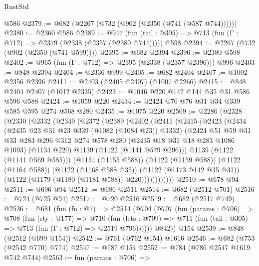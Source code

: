 \begin{lexlean}{RustStd}
\begin{coremodule}
    @586
@2379 := @682 (@2267 (@732 (@902 (@2350 (@741 (@587 @744))))))
@2380 := @2360 @586
@2389 := @947
    (fun (tail : @305) => @713 (fun (Γ : @712) => @2379 (@2338 (@2357 (@2380 @744)))))
    @598
@2394 := @2267 (@732 (@902 (@2350 (@741 @599))))
@2395 := @682 @2394
@2396 := @2380 @598
@2402 := @965 (fun (Γ : @712) => @2395 (@2338 (@2357 @2396))) @996
@2403 := @848 @2394
@2404 := @2336 @999
@2405 := @682 @2404
@2407 := @1002 @2356 @2396
@2411 := @2403 (@2405 @2407) (@1007 @2266)
@2415 := @848 @2404 @2407 (@1012 @2335)
@2423 := @1046 @220 @142 @144 @35 @31 @586 @596 @588
@2424 := @1059 @220
@2434 := @2424 @70 @76 @31 @34 @339 @585 @595 @274 @568 @280
@2435 := @1075 @220
@2509 := @2286
    (@2328
      (@2330
        (@2332
          (@2349
            (@2372
              (@2389
                (@2402
                  (@2411
                    (@2415
                      (@2423
                        (@2434
                          (@2435 @23 @31 @23 @339 (@1082 (@1084 @23)) @1332)
                          (@2424
                            @51
                            @59
                            @31
                            @33
                            @283
                            @296
                            @312
                            @274
                            @578
                            @280
                            (@2435 @18 @31 @18 @283 @1086 @1093)
                            (@1134 @220)
                            @1139
                            (@1122 (@1141 @579 @296)))
                          @1139
                          (@1122 (@1141 @569 @585)))
                        (@1154 (@1155 @588))
                        (@1122 (@1159 @588))
                        (@1122 (@1164 @588))
                        (@1122 (@1168 @588 @35))
                        (@1122 (@1173 @142 @35 @31))
                        (@1122 (@1179 (@1180 (@1181 @588)) @220))))))))))))
@2510 := @678 @94
@2511 := @696 @94
@2512 := @686 @2511
@2514 := @682 (@2512 @701)
@2516 := @724 (@725 @94)
@2517 := @720 @2516
@2519 := @682 (@2517 @749)
@2536 := @681
    (fun (fn : @7) =>
    @2514
      (@704
        (@707
          (fun (params : @706) =>
          @708
            (fun (rty : @177) =>
            @710
              (fun (lets : @709) =>
              @711 (fun (tail : @305) => @713 (fun (Γ : @712) => @2519 @796))))))
        @842))
    @154
@2539 := @848 (@2512 (@699 @154))
@2542 := @761 (@762 @154) @1616
@2546 := @682 (@753 (@2542 @770) @774)
@2547 := @787 @154
@2552 := @784 (@786 @2547 @1619 @742 @744)
@2563 := fun (params : @706) =>

\end{coremodule}
\end{lexlean}
